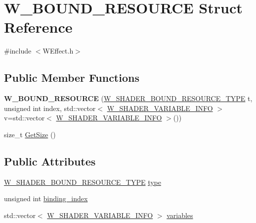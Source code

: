 \hypertarget{struct_w___b_o_u_n_d___r_e_s_o_u_r_c_e}{}\section{W\+\_\+\+B\+O\+U\+N\+D\+\_\+\+R\+E\+S\+O\+U\+R\+CE Struct Reference}
\label{struct_w___b_o_u_n_d___r_e_s_o_u_r_c_e}


{\ttfamily \#include $<$W\+Effect.\+h$>$}

\subsection*{Public Member Functions}
\begin{DoxyCompactItemize}
\item 
{\bfseries W\+\_\+\+B\+O\+U\+N\+D\+\_\+\+R\+E\+S\+O\+U\+R\+CE} (\hyperlink{group__engineclass_ga6f7d88d2bbec56561a4b13c4e6604893}{W\+\_\+\+S\+H\+A\+D\+E\+R\+\_\+\+B\+O\+U\+N\+D\+\_\+\+R\+E\+S\+O\+U\+R\+C\+E\+\_\+\+T\+Y\+PE} t, unsigned int index, std\+::vector$<$ \hyperlink{struct_w___s_h_a_d_e_r___v_a_r_i_a_b_l_e___i_n_f_o}{W\+\_\+\+S\+H\+A\+D\+E\+R\+\_\+\+V\+A\+R\+I\+A\+B\+L\+E\+\_\+\+I\+N\+FO} $>$ v=std\+::vector$<$ \hyperlink{struct_w___s_h_a_d_e_r___v_a_r_i_a_b_l_e___i_n_f_o}{W\+\_\+\+S\+H\+A\+D\+E\+R\+\_\+\+V\+A\+R\+I\+A\+B\+L\+E\+\_\+\+I\+N\+FO} $>$())\hypertarget{struct_w___b_o_u_n_d___r_e_s_o_u_r_c_e_a4e37d8d03ddab7339eb6b2b9e52453bd}{}\label{struct_w___b_o_u_n_d___r_e_s_o_u_r_c_e_a4e37d8d03ddab7339eb6b2b9e52453bd}

\item 
size\+\_\+t \hyperlink{struct_w___b_o_u_n_d___r_e_s_o_u_r_c_e_a4316bb3b61abf67c9c4d1816175d38d1}{Get\+Size} ()
\end{DoxyCompactItemize}
\subsection*{Public Attributes}
\begin{DoxyCompactItemize}
\item 
\hyperlink{group__engineclass_ga6f7d88d2bbec56561a4b13c4e6604893}{W\+\_\+\+S\+H\+A\+D\+E\+R\+\_\+\+B\+O\+U\+N\+D\+\_\+\+R\+E\+S\+O\+U\+R\+C\+E\+\_\+\+T\+Y\+PE} \hyperlink{struct_w___b_o_u_n_d___r_e_s_o_u_r_c_e_aba210bfb28ce06d4ab333eeab7877222}{type}
\item 
unsigned int \hyperlink{struct_w___b_o_u_n_d___r_e_s_o_u_r_c_e_ae50619693d5d7b0ce92770fedebcf7a7}{binding\+\_\+index}
\item 
std\+::vector$<$ \hyperlink{struct_w___s_h_a_d_e_r___v_a_r_i_a_b_l_e___i_n_f_o}{W\+\_\+\+S\+H\+A\+D\+E\+R\+\_\+\+V\+A\+R\+I\+A\+B\+L\+E\+\_\+\+I\+N\+FO} $>$ \hyperlink{struct_w___b_o_u_n_d___r_e_s_o_u_r_c_e_a700e968f2052b08e3b2747c168f91f47}{variables}
\end{DoxyCompactItemize}


